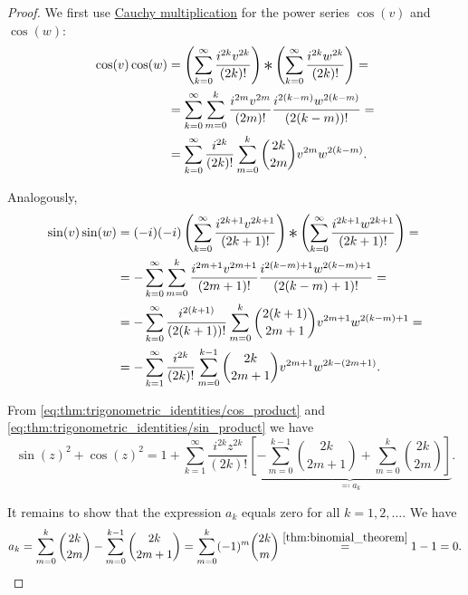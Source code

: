 \begin{proof}
  We first use \hyperref[def:algebra_of_polynomials/polynomial_multiplication]{Cauchy multiplication} for the power series \( \cos(v) \) and \( \cos(w) \):
  \begin{align}
    \cos(v) \cos(w)
    &=
    \left( \sum_{k=0}^\infty \frac {i^{2k} v^{2k}} {(2k)!} \right) \Ast \left( \sum_{k=0}^\infty \frac {i^{2k} w^{2k}} {(2k)!} \right)
    = \nonumber \\ &=
    \sum_{k=0}^\infty \sum_{m=0}^k \frac {i^{2m} v^{2m}} {(2m)!} \frac {i^{2(k-m)} w^{2(k-m)}} {(2(k-m))!}
    = \nonumber \\ &=
    \sum_{k=0}^\infty \frac {i^{2k}} {(2k)!} \sum_{m=0}^k \binom {2k} {2m} v^{2m} w^{2(k-m)}. \label{eq:thm:trigonometric_identities/cos_product}
  \end{align}

  Analogously,
  \begin{align}
    \sin(v) \sin(w)
    &=
    (-i) (-i) \left( \sum_{k=0}^\infty \frac {i^{2k+1} v^{2k+1}} {(2k+1)!} \right) \Ast \left( \sum_{k=0}^\infty \frac {i^{2k+1} w^{2k+1}} {(2k+1)!} \right)
    = \nonumber \\ &=
    -\sum_{k=0}^\infty \sum_{m=0}^k \frac {i^{2m+1} v^{2m+1}} {(2m+1)!} \frac {i^{2(k-m)+1} w^{2(k-m)+1}} {(2(k-m)+1)!}
    = \nonumber \\ &=
    -\sum_{k=0}^\infty \frac {i^{2(k+1)}} {(2(k+1))!} \sum_{m=0}^k \binom {2(k+1)} {2m+1} v^{2m+1} w^{2(k-m)+1}
    = \nonumber \\ &=
    -\sum_{k=1}^\infty \frac {i^{2k}} {(2k)!} \sum_{m=0}^{k-1} \binom {2k} {2m+1} v^{2m+1} w^{2k-(2m+1)}. \label{eq:thm:trigonometric_identities/sin_product}
  \end{align}

   From \eqref{eq:thm:trigonometric_identities/cos_product} and \eqref{eq:thm:trigonometric_identities/sin_product} we have
  \begin{equation*}
    \sin(z)^2 + \cos(z)^2
    =
    1 + \sum_{k=1}^\infty \frac {i^{2k} z^{2k}} {(2k)!} \underbrace{\left[-\sum_{m=0}^{k-1} \binom {2k} {2m+1} + \sum_{m=0}^k \binom {2k} {2m} \right]}_{\eqqcolon a_k}.
  \end{equation*}

  It remains to show that the expression \( a_k \) equals zero for all \( k = 1, 2, \ldots \). We have
  \begin{equation*}
    a_k
    =
    \sum_{m=0}^k \binom {2k} {2m} - \sum_{m=0}^{k-1} \binom {2k} {2m+1}
    =
    \sum_{m=0}^k (-1)^m \binom {2k} m
    \overset {\ref{thm:binomial_theorem}} =
    1 - 1 = 0.
  \end{equation*}


\end{proof}
